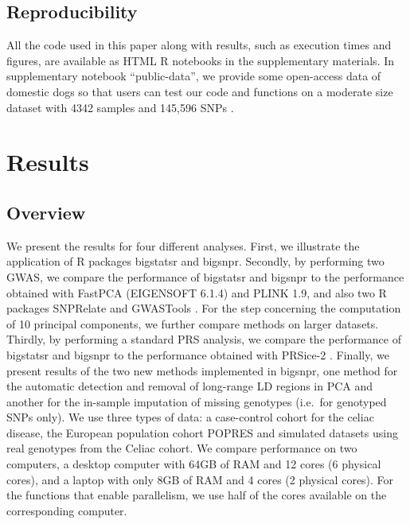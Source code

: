 \documentclass{bioinfo}
\begin{document}
\begin{methods}
\subsection{Reproducibility}

All the code used in this paper along with results, such as execution times and figures, are available as HTML R notebooks in the supplementary materials. 
{\color{red}
In supplementary notebook ``public-data'', we provide some open-access data of domestic dogs so that users can test our code and functions on a moderate size dataset with 4342 samples and 145,596 SNPs \cite[]{hayward2016complex}.
}

\end{methods}

\section{Results}

\subsection{Overview}\label{sec:overview}

We present the results for four different analyses. 
First, we illustrate the application of R packages bigstatsr and bigsnpr. 
Secondly, by performing two GWAS, we compare the performance of bigstatsr and bigsnpr to the performance obtained with FastPCA (EIGENSOFT 6.1.4) and PLINK 1.9, and also two R packages SNPRelate and GWASTools \cite[]{chang2015second,Galinsky2016,Gogarten2012,zheng2012high}. For the step concerning the computation of 10 principal components, we further compare methods on larger datasets.
Thirdly, by performing a standard PRS analysis, we compare the performance of bigstatsr and bigsnpr to the performance obtained with PRSice-2 \cite[]{Euesden2015}. 
Finally, we present results of the two new methods implemented in bigsnpr, one method for the automatic detection and removal of long-range LD regions in PCA and another for the in-sample imputation of missing genotypes (i.e.\ for genotyped SNPs only). 
We use three types of data: a case-control cohort for the celiac disease, the European population cohort POPRES and simulated datasets using real genotypes from the Celiac cohort. 
We compare performance on two computers, a desktop computer with 64GB of RAM and 12 cores (6 physical cores), and a laptop with only 8GB of RAM and 4 cores (2 physical cores). For the functions that enable parallelism, we use half of the cores available on the corresponding computer.
\end{document}
